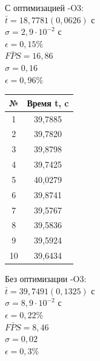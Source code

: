 \documentclass[12pt, letterpaper]{article}
\begin{document}
     С оптимизацией -O3:\\

    $\bar{t} = 18,7781 (0,0626)$ с\\

    $\sigma = 2,9 \cdot 10^{-2}$ с\\

    $\epsilon = 0,15\%$\\

    $\bar{FPS} = 16,86$\\

    $\sigma = 0,16$\\

    $\epsilon = 0,96\%$\\

    \begin{table}
        \begin{tabular}{cc}
        \toprule             %
        \textbf{№} & \textbf{Время t, c} \\
        \midrule             %
        1 & 39,7885 \\
        2 & 39,7820 \\
        3 & 39,8798 \\
        4 & 39,7425 \\
        5 & 40,0279 \\
        6 & 39,8741 \\
        7 & 39,5767 \\
        8 & 39,5836 \\
        9 & 39,5924 \\
        10 & 39,6434 \\
        \bottomrule          %
        \end{tabular}
    \end{table}

    Без оптимизации -O3:\\

    $\bar{t} = 39,7491 (0,1325)$ с\\

    $\sigma = 8,9 \cdot 10^{-2}$ с\\

    $\epsilon = 0,22\%$\\

    $\bar{FPS} = 8,46$\\

    $\sigma = 0,02$\\

    $\epsilon = 0,3\%$\\
\end{document}
